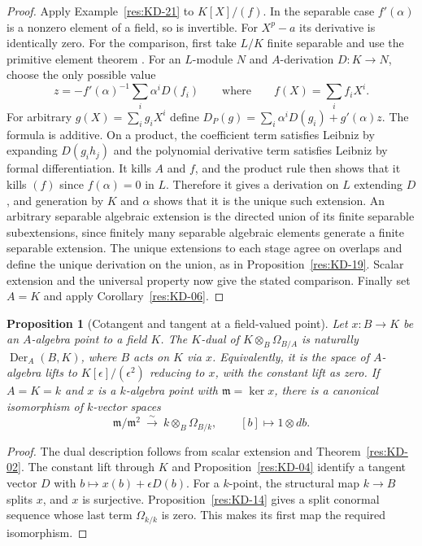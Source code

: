 \documentclass[11pt,oneside,openany]{book}
\newtheorem{proposition}[theorem]{Proposition}
\theoremstyle{definition}
\theoremstyle{remark}
\begin{document}
\begin{proof}
Apply Example~\ref{res:KD-21} to $K[X]/(f)$. In the separable case $f'(\alpha)$ is a nonzero element of a field, so is invertible. For $X^p-a$ its derivative is identically zero. For the comparison, first take $L/K$ finite separable and use the primitive element theorem \cite[Chapter 12, Primitive Element Theorem]{d07}. For an $L$-module $N$ and $A$-derivation $D:K\to N$, choose the only possible value
\[
 z=-f'(\alpha)^{-1}\sum_i \alpha^i D(f_i)
 \qquad \text{where}\qquad f(X)=\sum_i f_i X^i.
\]
For arbitrary $g(X)=\sum_i g_i X^i$ define $D_P(g)=\sum_i\alpha^i D(g_i)+g'(\alpha)z$. The formula is additive. On a product, the coefficient term satisfies Leibniz by expanding $D(g_i h_j)$ and the polynomial derivative term satisfies Leibniz by formal differentiation. It kills $A$ and $f$, and the product rule then shows that it kills $(f)$ since $f(\alpha)=0$ in $L$. Therefore it gives a derivation on $L$ extending $D$, and generation by $K$ and $\alpha$ shows that it is the unique such extension. An arbitrary separable algebraic extension is the directed union of its finite separable subextensions, since finitely many separable algebraic elements generate a finite separable extension. The unique extensions to each stage agree on overlaps and define the unique derivation on the union, as in Proposition~\ref{res:KD-19}. Scalar extension and the universal property now give the stated comparison. Finally set $A=K$ and apply Corollary~\ref{res:KD-06}.
\end{proof}

\begin{proposition}[Cotangent and tangent at a field-valued point]\label{res:KD-23}
Let $x:B\to K$ be an $A$-algebra point to a field $K$. The $K$-dual of $K\otimes_B\Omega_{B/A}$ is naturally $\operatorname{Der}_A(B,K)$, where $B$ acts on $K$ via $x$. Equivalently, it is the space of $A$-algebra lifts to $K[\epsilon]/(\epsilon^2)$ reducing to $x$, with the constant lift as zero. If $A=K=k$ and $x$ is a $k$-algebra point with $\mathfrak m=\ker x$, there is a canonical isomorphism of $k$-vector spaces
\[
 \mathfrak m/\mathfrak m^2\ \xrightarrow{\ \sim\ }\ k\otimes_B\Omega_{B/k},
 \qquad [b]\longmapsto 1\otimes db .
\]
\end{proposition}

\begin{proof}
The dual description follows from scalar extension and Theorem~\ref{res:KD-02}. The constant lift through $K$ and Proposition~\ref{res:KD-04} identify a tangent vector $D$ with $b\mapsto x(b)+\epsilon D(b)$. For a $k$-point, the structural map $k\to B$ splits $x$, and $x$ is surjective. Proposition~\ref{res:KD-14} gives a split conormal sequence whose last term $\Omega_{k/k}$ is zero. This makes its first map the required isomorphism.
\end{proof}
\end{document}

